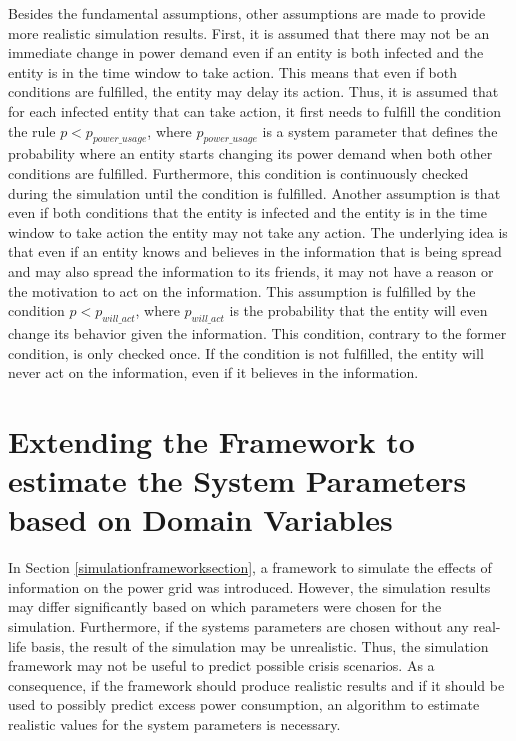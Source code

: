 Besides the fundamental assumptions, other assumptions are made 
to provide more realistic simulation results. %
First, it is assumed that there may not be an immediate change 
in power demand even if an entity is both infected and the entity 
is in the time window to take action. This means that even if
both conditions are fulfilled, the entity may delay its action. 
Thus, it is assumed that for each infected entity that can 
take action, it first needs to fulfill the condition 
the rule $p<p_{power\_usage}$, where $p_{power\_usage}$ is a system
parameter that defines the probability where an entity
starts changing its power demand when both other conditions are
fulfilled. Furthermore, this condition is continuously checked 
during the simulation until the condition is fulfilled.
Another assumption is that even if both conditions that
the entity is infected and the entity is in the time window 
to take action the entity may not take any action.
The underlying idea is that even if an entity knows and believes
in the information that is being spread and may also spread
the information to its friends, it may not have a 
reason or the motivation to act on the information.
This assumption is fulfilled by the condition $p<p_{will\_act}$,
where $p_{will\_act}$ is the probability that the 
entity will even change its behavior given the information.
This condition, contrary to the former condition, is only
checked once. If the condition is not fulfilled, the 
entity will never act on the information, even if 
it believes in the information.






\section{Extending the Framework to estimate the System Parameters based on
Domain Variables}
\label{parameterestimationalgo}

In Section \ref{simulationframeworksection}, a framework to simulate the effects 
of information on the power grid was introduced. However, the simulation results
may differ significantly based on which parameters were chosen for the simulation.
Furthermore, if the systems parameters are chosen without any real-life basis,
the result of the simulation may be unrealistic. Thus, the simulation framework 
may not be useful to predict possible crisis scenarios.
As a consequence, if the framework should produce realistic results and if
it should be used to possibly predict excess power consumption, an 
algorithm to estimate realistic values for the system parameters is necessary.

